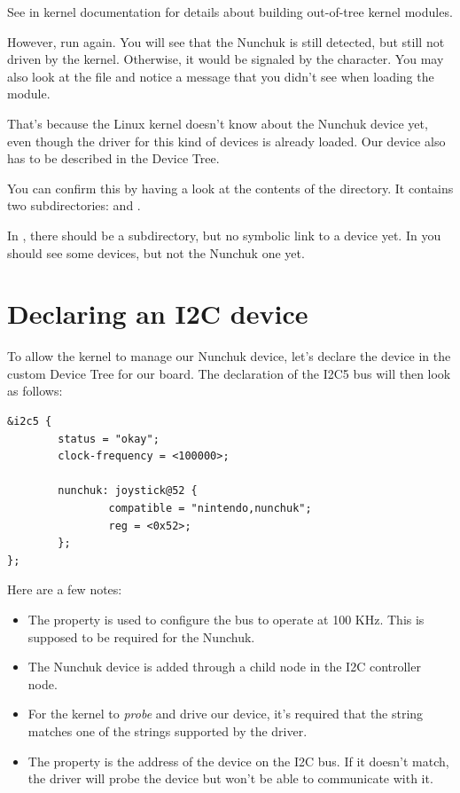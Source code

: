 See  in kernel documentation
for details about building out-of-tree kernel modules.

However, run  again. You will see that the
Nunchuk is still detected, but still not driven by the kernel.
Otherwise, it would be signaled by the  character. You
may also look at the  file and notice a
 message that you didn't
see when loading the module.

That's because the Linux kernel doesn't know about the Nunchuk
device yet, even though the driver for this kind of devices is
already loaded. Our device also has to be described in the Device Tree.

You can confirm this by having a look at the contents of the
 directory.  It contains two subdirectories:
 and .

In , there should be a  subdirectory,
but no symbolic link to a device yet. In  you should
see some devices, but not the Nunchuk one yet.

\section{Declaring an I2C device}

To allow the kernel to manage our Nunchuk device, let's declare the
device in the custom Device Tree for our board. The declaration of the I2C5
bus will then look as follows:

\begin{verbatim}
&i2c5 {
        status = "okay";
        clock-frequency = <100000>;

        nunchuk: joystick@52 {
                compatible = "nintendo,nunchuk";
                reg = <0x52>;
        };
};
\end{verbatim}

Here are a few notes:
\begin{itemize}
\item The  property is used to configure the bus
      to operate at 100 KHz. This is supposed to be required for the
      Nunchuk.
\item The Nunchuk device is added through a child node in the I2C
      controller node.
\item For the kernel to {\em probe} and drive our device, it's required
      that the  string matches one of the
       strings supported by the driver.
\item The  property is the address of the device on the
      I2C bus. If it doesn't match, the driver will probe the device
      but won't be able to communicate with it.
\end{itemize}

